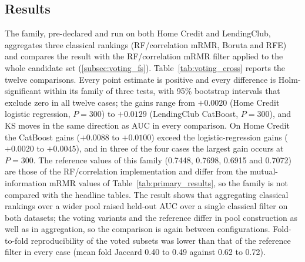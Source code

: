 \documentclass[final,5p,twocolumn]{elsarticle}
\begin{document}
\subsection{Results}
\label{subsec:voting_results}

The family, pre-declared and run on both Home Credit and LendingClub, aggregates three classical rankings (RF\slash correlation mRMR, Boruta and RFE) and compares the result with the RF\slash correlation mRMR filter applied to the whole candidate set (\ref{subsec:voting_fs}). Table~\ref{tab:voting_cross} reports the twelve comparisons. Every point estimate is positive and every difference is Holm-significant within its family of three tests, with 95\% bootstrap intervals that exclude zero in all twelve cases; the gains range from $+0.0020$ (Home Credit logistic regression, $P=300$) to $+0.0129$ (LendingClub CatBoost, $P=300$), and KS moves in the same direction as AUC in every comparison. On Home Credit the CatBoost gains ($+0.0088$ to $+0.0100$) exceed the logistic-regression gains ($+0.0020$ to $+0.0045$), and in three of the four cases the largest gain occurs at $P=300$. The reference values of this family (0.7448, 0.7698, 0.6915 and 0.7072) are those of the RF\slash correlation implementation and differ from the mutual-information mRMR values of Table~\ref{tab:primary_results}, so the family is not compared with the headline tables. The result shows that aggregating classical rankings over a wider pool raised held-out AUC over a single classical filter on both datasets; the voting variants and the reference differ in pool construction as well as in aggregation, so the comparison is again between configurations. Fold-to-fold reproducibility of the voted subsets was lower than that of the reference filter in every case (mean fold Jaccard 0.40 to 0.49 against 0.62 to 0.72).
\end{document}
